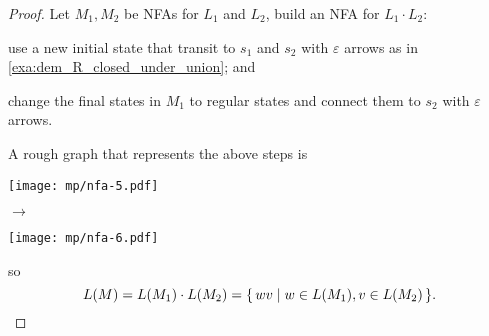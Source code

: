 \begin{example}
    \begin{proof}
        Let $M_1, M_2$ be NFAs for $L_1$ and $L_2$,
        build an NFA for $L_1 \cdot L_2$:
        \begin{compactenum}
        \item use a new initial state that transit to $s_1$ and $s_2$ with $\varepsilon$
            arrows as in \autoref{exa:dem_R_closed_under_union}; and
        \item change the final states in $M_1$ to regular states and connect them to $s_2$
            with $\varepsilon$ arrows.
        \end{compactenum}
        A rough graph that represents the above steps is
        \begin{center}
            \begin{minipage}{4cm}
                \texttt{[image: mp/nfa-5.pdf]}
            \end{minipage}
            \; $\longrightarrow$ \;
            \begin{minipage}{4cm}
                \texttt{[image: mp/nfa-6.pdf]} 
            \end{minipage}
        \end{center}
        so
        \[
            L(M) = L(M_1) \cdot L(M_2) = { \left\{\, wv \mid w \in L(M_1), v \in L(M_2) \,\right\} }.
        \]
    \end{proof}
\end{example}

